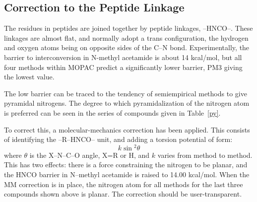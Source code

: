\subsection{Correction to the Peptide Linkage}
The residues in peptides are joined together by  peptide  linkages, --HNCO--.  
These  linkages  are  almost  flat, and normally adopt a trans configuration,
the hydrogen and oxygen atoms being on opposite sides  of the  C--N  bond.  
Experimentally,  the  barrier  to  interconversion  in  N-methyl acetamide is about 14 kcal/mol, but all  four  methods 
within  MOPAC  predict  a  significantly 
lower  barrier,  PM3 giving the lowest value.

The low barrier can be traced  to  the  tendency  of  semiempirical methods  
to   give   pyramidal   nitrogens.    The   degree   to  which pyramidalization
of the nitrogen atom is preferred can be  seen  in  the series of compounds
given in Table~\ref{py}.

To correct this, a molecular-mechanics correction has been applied.
   This  consists  of  identifying  the --R--HNCO-- unit, and
adding a torsion potential of form: 
\[
k \sin \! ^{2} \theta
\]
where $\theta$ is the X--N--C--O angle, X=R or H, and $k$ varies from method to 
method.   This  has  two effects:  there is a force constraining the nitrogen
to be planar, and the HNCO barrier in N--methyl acetamide is  raised to  14.00 
kcal/mol.   When the MM correction is in place, the nitrogen atom for all
methods for the last three compounds shown above is planar. The correction
should be user-transparent.

